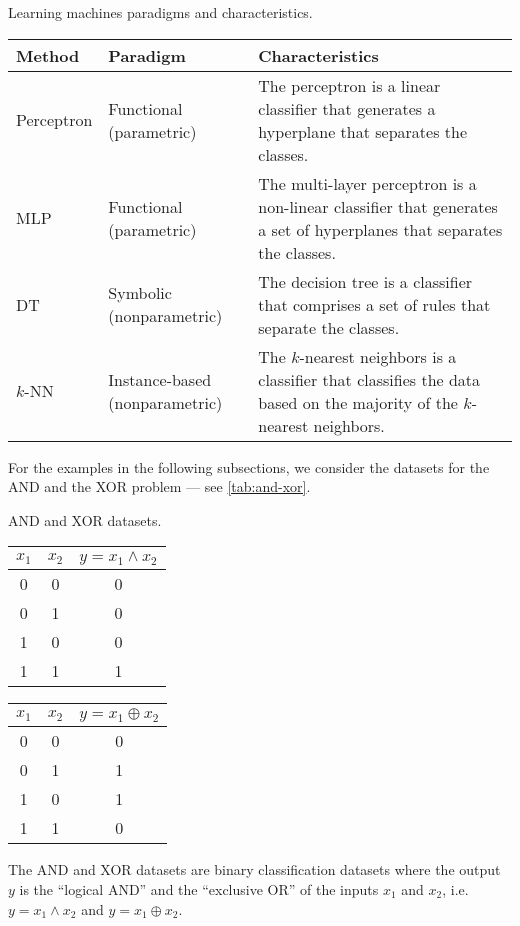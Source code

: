 \begin{tablebox}[label=tab:paradigm]{Learning machines paradigms and characteristics.}
  \begin{tabularx}{\textwidth}{lX@{}X@{}}
    \toprule
    \textbf{Method} & \textbf{Paradigm} & \textbf{Characteristics} \\
    \midrule
    Perceptron & Functional (parametric) & The perceptron is a linear classifier that generates a hyperplane that separates the classes. \\
    MLP & Functional (parametric) & The multi-layer perceptron is a non-linear classifier that generates a set of hyperplanes that separates the classes. \\
    DT & Symbolic (nonparametric) & The decision tree is a classifier that comprises a set of rules that separate the classes. \\
    $k$-NN & Instance-based (nonparametric) & The $k$-nearest neighbors is a classifier that classifies the data based on the majority of the $k$-nearest neighbors. \\
    \bottomrule
  \end{tabularx}
\end{tablebox}

For the examples in the following subsections, we consider the datasets for the AND
and the XOR problem --- see \cref{tab:and-xor}.

\begin{tablebox}[label=tab:and-xor]{AND and XOR datasets.}
  \centering
  \begin{minipage}{0.45\textwidth}
    \centering
    \begin{tabular}{ccc}
      \toprule
      $x_1$ & $x_2$ & $y = x_1 \land x_2$ \\
      \midrule
      0 & 0 & 0 \\
      0 & 1 & 0 \\
      1 & 0 & 0 \\
      1 & 1 & 1 \\
      \bottomrule
    \end{tabular}
  \end{minipage}
  \begin{minipage}{0.45\textwidth}
  \centering
  \begin{tabular}{ccc}
    \toprule
    $x_1$ & $x_2$ & $y = x_1 \oplus x_2$ \\
    \midrule
    0 & 0 & 0 \\
    0 & 1 & 1 \\
    1 & 0 & 1 \\
    1 & 1 & 0 \\
    \bottomrule
  \end{tabular}
  \end{minipage}
  \tcblower
  The AND and XOR datasets are binary classification datasets where the output $y$ is the
  ``logical AND'' and the ``exclusive OR'' of the inputs $x_1$ and $x_2$, i.e.
  $y = x_1 \land x_2$ and $y = x_1 \oplus x_2$.
\end{tablebox}

